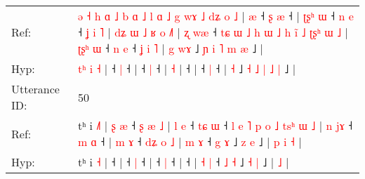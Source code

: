 \documentclass[10pt]{article}
\DeclareRobustCommand{\hl}[1]{{\textcolor{red}{#1}}}
\begin{document}
\begin{longtable}{ll}
Ref: & \hl{ə}\hl{ }\hl{˧}\hl{ }\hl{h}\hl{ }\hl{ɑ}\hl{ }\hl{˩}\hl{ }\hl{b}\hl{ }\hl{ɑ}\hl{ }\hl{˩}\hl{ }\hl{l}\hl{ }\hl{ɑ}\hl{ }\hl{˩}\hl{ }\hl{g}\hl{ }\hl{w}\hl{ɤ}\hl{ }\hl{˩}\hl{ }\hl{d}\hl{ʑ} \hl{o} \hl{˩} |\hl{ }\hl{æ} ˧\hl{ }\hl{ʂ} \hl{æ} ˧ |\hl{ }\hl{ʈ}\hl{ʂ}\hl{ʰ}\hl{ }\hl{ɯ} ˧\hl{ }\hl{n} \hl{e} ˧\hl{ }\hl{ʝ}\hl{ }\hl{i}\hl{ }\hl{˥} |\hl{ }\hl{d}\hl{ʑ}\hl{ }\hl{ɯ}\hl{ }\hl{˩}\hl{ }\hl{ʁ}\hl{ }\hl{o} \hl{˩}\hl{˥} |\hl{ }\hl{ʐ}\hl{ }\hl{w}\hl{æ} ˧\hl{ }\hl{t}\hl{ɕ}\hl{ }\hl{ɯ}\hl{ }\hl{˩}\hl{ }\hl{h}\hl{ }\hl{ɯ}\hl{ }\hl{˩}\hl{ }\hl{h}\hl{ }\hl{i}\hl{̃}\hl{ }\hl{˩}\hl{ }\hl{ʈ}\hl{ʂ}\hl{ʰ}\hl{ }\hl{ɯ}\hl{ }\hl{˩} |\hl{ }\hl{ʈ}\hl{ʂ}\hl{ʰ}\hl{ }\hl{ɯ} ˧\hl{ }\hl{n} \hl{e} ˧\hl{ }\hl{ʝ}\hl{ }\hl{i}\hl{ }\hl{˥} |\hl{ }\hl{g} \hl{w}\hl{ɤ} ˩ \hl{ɲ} \hl{i} \hl{˥} \hl{m} \hl{æ} ˩ |
 \\
Hyp: & \hl{}\hl{}\hl{}\hl{}\hl{}\hl{}\hl{}\hl{}\hl{}\hl{}\hl{}\hl{}\hl{}\hl{}\hl{}\hl{}\hl{}\hl{}\hl{}\hl{}\hl{}\hl{}\hl{}\hl{}\hl{}\hl{}\hl{}\hl{}\hl{}\hl{t}\hl{ʰ} \hl{i} \hl{˧} |\hl{}\hl{} ˧\hl{}\hl{} \hl{|} ˧ |\hl{}\hl{}\hl{}\hl{}\hl{}\hl{} ˧\hl{}\hl{} \hl{|} ˧\hl{}\hl{}\hl{}\hl{}\hl{}\hl{} |\hl{}\hl{}\hl{}\hl{}\hl{}\hl{}\hl{}\hl{}\hl{}\hl{}\hl{} \hl{}\hl{˧} |\hl{}\hl{}\hl{}\hl{}\hl{} ˧\hl{}\hl{}\hl{}\hl{}\hl{}\hl{}\hl{}\hl{}\hl{}\hl{}\hl{}\hl{}\hl{}\hl{}\hl{}\hl{}\hl{}\hl{}\hl{}\hl{}\hl{}\hl{}\hl{}\hl{}\hl{}\hl{}\hl{}\hl{} |\hl{}\hl{}\hl{}\hl{}\hl{}\hl{} ˧\hl{}\hl{} \hl{|} ˧\hl{}\hl{}\hl{}\hl{}\hl{}\hl{} |\hl{}\hl{} \hl{}\hl{˧} ˩ \hl{˧} \hl{˩} \hl{|} \hl{˩} \hl{|} ˩ |
 \\
\midrule
Utterance ID: & 50 \\
Ref: & tʰ i \hl{˩}\hl{˥} |\hl{ }\hl{ʂ}\hl{ }\hl{æ} ˧\hl{ }\hl{ʂ}\hl{ }\hl{æ}\hl{ }\hl{˩} |\hl{ }\hl{l}\hl{ }\hl{e} ˧\hl{ }\hl{t}\hl{ɕ} \hl{ɯ} ˧\hl{ }\hl{l}\hl{ }\hl{e}\hl{ }\hl{˥}\hl{ }\hl{p}\hl{ }\hl{o}\hl{ }\hl{˩}\hl{ }\hl{t}\hl{s}\hl{ʰ}\hl{ }\hl{ɯ}\hl{ }\hl{˩} |\hl{ }\hl{n}\hl{ }\hl{j}\hl{ɤ} ˧\hl{ }\hl{m} \hl{ɑ} ˧ |\hl{ }\hl{m}\hl{ }\hl{ɤ} ˧\hl{ }\hl{d}\hl{ʑ}\hl{ }\hl{o}\hl{ }\hl{˩} | \hl{m} \hl{ɤ} ˧ \hl{g} \hl{ɤ} ˩ \hl{z} \hl{e} ˩ |\hl{ }\hl{p}\hl{ }\hl{i} \hl{˧} |
 \\
Hyp: & tʰ i \hl{}\hl{˧} |\hl{}\hl{}\hl{}\hl{} ˧\hl{}\hl{}\hl{}\hl{}\hl{}\hl{} |\hl{}\hl{}\hl{}\hl{} ˧\hl{}\hl{}\hl{} \hl{|} ˧\hl{}\hl{}\hl{}\hl{}\hl{}\hl{}\hl{}\hl{}\hl{}\hl{}\hl{}\hl{}\hl{}\hl{}\hl{}\hl{}\hl{}\hl{}\hl{}\hl{} |\hl{}\hl{}\hl{}\hl{}\hl{} ˧\hl{}\hl{} \hl{|} ˧ |\hl{}\hl{}\hl{}\hl{} ˧\hl{}\hl{}\hl{}\hl{}\hl{}\hl{}\hl{} | \hl{˧} \hl{|} ˧ \hl{˩} \hl{˧} ˩ \hl{˧} \hl{|} ˩ |\hl{}\hl{}\hl{}\hl{} \hl{˩} |
 \\

\end{longtable}
\end{document}
